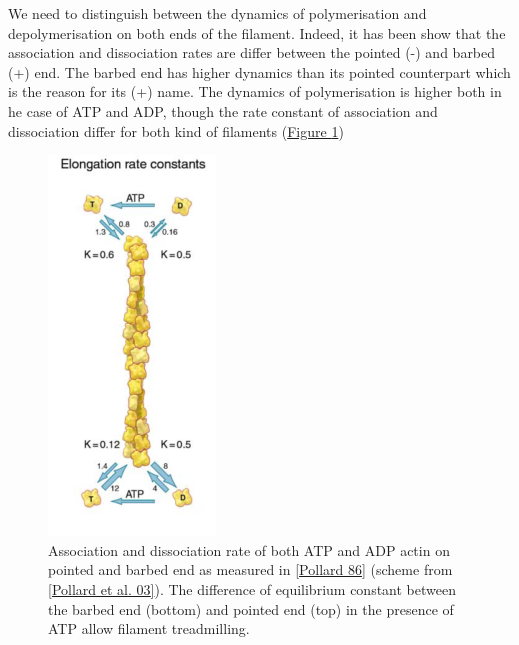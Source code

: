 \documentclass[A4paperpaper,11pt,english]{sphinxmanual}
\begin{document}
We need to distinguish between the dynamics of polymerisation and
depolymerisation on both ends of the filament. Indeed, it has been show that the
association and dissociation rates are differ between the pointed (-) and
barbed (+) end. The barbed end has  higher dynamics than its pointed
counterpart which is the reason for its (+) name. The dynamics of
polymerisation is higher both in he case of ATP and ADP, though the rate
constant of association and dissociation differ for both kind of filaments (\hyperref[index-latex:fig-actin-pollard]{Figure  \ref*{index-latex:fig-actin-pollard}})
\begin{figure}[htbp]
\centering
\capstart

\includegraphics[width=0.250\linewidth]{elongation-rate-constant.png}
\caption{Association and dissociation rate of both ATP and ADP actin on pointed and
barbed end as measured in {\hyperref[index-latex:pollard1986]{{[}Pollard 86{]}}} (scheme from {\hyperref[index-latex:pollard2003]{{[}Pollard et al. 03{]}}}).
The difference of equilibrium constant between the barbed end (bottom)
and pointed end (top) in the presence of ATP allow filament treadmilling.}\label{index-latex:fig-actin-pollard}\end{figure}
\end{document}
